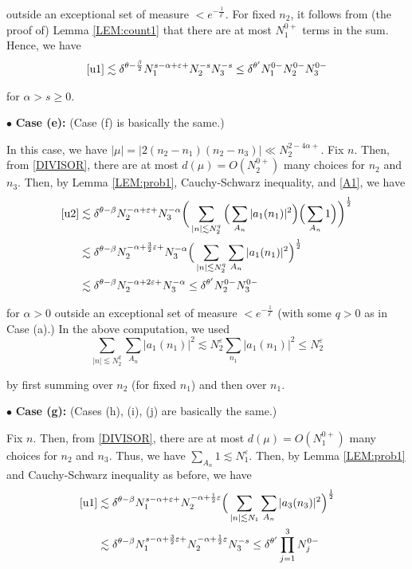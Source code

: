 \documentclass[11pt]{amsart}
\numberwithin{equation}{section} \numberwithin{theorem}{section}
\begin{document}
{
\noindent} outside an exceptional set of measure $< e^{-\frac{1}{{\delta}^c}}$. 
For fixed $n_2$, it follows from (the proof of) Lemma \ref{LEM:count1} that there are at most $N_1^{0+}$ terms in the sum. 
Hence, we have 
\begin{align*}
	\eqref{u1} \lesssim {\delta}^{\theta-\frac{\beta}{2}} N_1^{s -{\alpha} +{\varepsilon}+} 
	N_2^{-s} N_3^{-s} \leq {\delta}^{\theta'}N_1^{0-} N_2^{0-} N_3^{0-} 
\end{align*}

{
\noindent} for ${\alpha} > s \geq 0$.

\medskip

{
\noindent} $\bullet$ {\bf Case (e):} (Case (f) is basically the same.)

In this case, we have $ |\mu| = |2 (n_2 - n_1) (n_2 - n_3)| \ll N_2^{2-4{\alpha}+} $. 
Fix $n$.
Then, from \eqref{DIVISOR}, 
there are at most $d(\mu)  = O(N_2^{0+})$ many choices for $n_2$ and $n_3$.
Then, by Lemma \ref{LEM:prob1}, Cauchy-Schwarz inequality, and \eqref{A1}, we have
\begin{align*}
	\eqref{u2} 
& \lesssim {\delta}^{\theta-\beta} 
	N_2^{-{\alpha}+{\varepsilon}+} N_3^{-{\alpha}} \bigg( \sum_{|n| \lesssim N_2^q} 
	\Big(\sum_{A_n} |a_1(n_1)|^2\Big) \Big(\sum_{A_n} 1\Big) \bigg)^\frac{1}{2} \\
& \lesssim {\delta}^{\theta-\beta} 
	N_2^{-{\alpha}+\frac{3}{2}{\varepsilon}+} N_3^{-{\alpha}} \Big( \sum_{|n| \lesssim N_2^q} \sum_{A_n} |a_1(n_1)|^2 \Big)^\frac{1}{2} \\
& \lesssim {\delta}^{\theta-\beta} N_2^{-{\alpha}+2{\varepsilon}+} N_3^{ -{\alpha}} \leq {\delta}^{\theta'}N_2^{0-} N_3^{0-} 
\end{align*}

{
\noindent} for $ {\alpha} > 0$ outside an exceptional set of measure $<e^{-\frac{1}{{\delta}^c}}$
(with some $q>0$ as in Case (a).)
In the above computation, we used 
\[ \sum_{|n| \lesssim N_2^q} \sum_{A_n} |a_1(n_1)|^2
\lesssim N_2^{\varepsilon} \sum_{n_1} |a_1(n_1)|^2 \leq N_2^{\varepsilon}\]

{
\noindent}
by first summing over $n_2$ (for fixed $n_1$) and then over $n_1$.

\medskip

{
\noindent} $\bullet$ {\bf Case (g):} (Cases (h), (i), (j)  are basically the same.)

Fix $n$.
Then, from \eqref{DIVISOR}, 
there are at most $d(\mu)  = O(N_1^{0+})$ many choices for $n_2$ and $n_3$.
Thus, we have $\sum_{A_n} 1 \lesssim N_1^{\varepsilon}.$
Then, by Lemma \ref{LEM:prob1} and Cauchy-Schwarz inequality as before,  we have
\begin{align*}
	\eqref{u1} 
& \lesssim {\delta}^{\theta-\beta} 
	N_1^{s-{\alpha}+{\varepsilon}+} N_2^{-{\alpha}+ \frac{1}{2}{\varepsilon}} \Big( \sum_{|n| \lesssim N_1} 
	\sum_{A_n} |a_3(n_3)|^2\Big)^\frac{1}{2} \\
& \lesssim {\delta}^{\theta-\beta} 
	N_1^{s-{\alpha}+\frac{3}{2}{\varepsilon}+} N_2^{-{\alpha}+ \frac{1}{2}{\varepsilon}} N_3^{-s}
 \leq {\delta}^{\theta'}\prod_{j = 1}^3 N_j^{0-} 
\end{align*}
\end{document}
